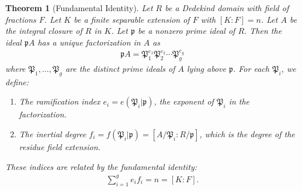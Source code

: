 \documentclass[12pt]{article}
\theoremstyle{plain}
\newtheorem{theorem}{Theorem}[section]
\theoremstyle{remark}
\theoremstyle{definition}
\begin{document}
\begin{theorem}[Fundamental Identity]
    Let $R$ be a Dedekind domain with field of fractions $F$. Let $K$ be a finite separable extension of $F$ with $[K:F] = n$. Let $A$ be the integral closure of $R$ in $K$. Let $\mathfrak{p}$ be a nonzero prime ideal of $R$. Then the ideal $\mathfrak{p}A$ has a unique factorization in $A$ as
    \begin{align*}
        \mathfrak{p}A = \mathfrak{P}_1^{e_1} \mathfrak{P}_2^{e_2} \cdots \mathfrak{P}_g^{e_g}
    \end{align*}
    where $\mathfrak{P}_1, \dots, \mathfrak{P}_g$ are the distinct prime ideals of $A$ lying above $\mathfrak{p}$. For each $\mathfrak{P}_i$, we define:
    \begin{enumerate}
        \item The \emph{ramification index} $e_i = e(\mathfrak{P}_i | \mathfrak{p})$, the exponent of $\mathfrak{P}_i$ in the factorization.
        \item The \emph{inertial degree} $f_i = f(\mathfrak{P}_i | \mathfrak{p}) = [A/\mathfrak{P}_i : R/\mathfrak{p}]$, which is the degree of the residue field extension.
    \end{enumerate}
    These indices are related by the \emph{fundamental identity}:
    \begin{align*}
        \sum_{i=1}^g e_i f_i = n = [K:F].
    \end{align*}
\end{theorem}
\end{document}
